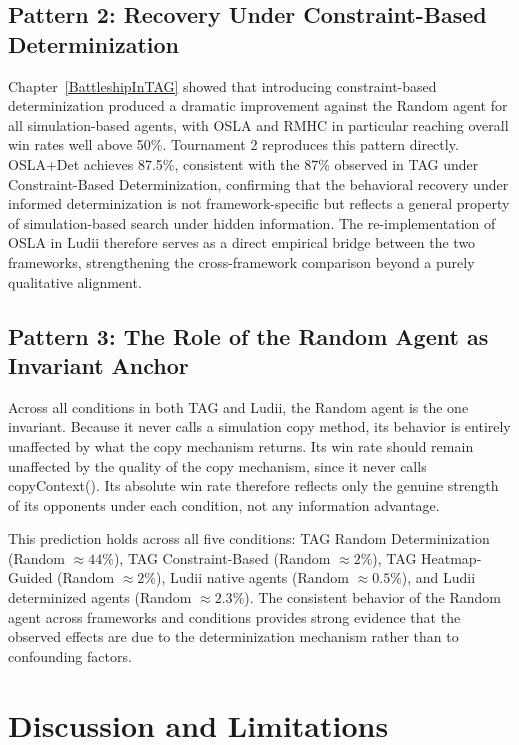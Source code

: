 \subsection{Pattern 2: Recovery Under Constraint-Based Determinization}
Chapter~\ref{BattleshipInTAG} showed that introducing constraint-based determinization produced a dramatic improvement against the Random agent for all simulation-based agents, with OSLA and RMHC in particular reaching overall win rates well above 50\%. Tournament 2 reproduces this pattern directly. OSLA+Det achieves 87.5\%, consistent with the 87\% observed in TAG under Constraint-Based Determinization, confirming that the behavioral recovery under informed determinization is not framework-specific but reflects a general property of simulation-based search under hidden information. The re-implementation of OSLA in Ludii therefore serves as a direct 
empirical bridge between the two frameworks, strengthening the cross-framework comparison beyond a purely qualitative alignment.

\subsection{Pattern 3: The Role of the Random Agent as Invariant Anchor}
Across all conditions in both TAG and Ludii, the Random agent is the one invariant. Because it never calls a simulation copy method, its behavior is entirely unaffected by what the copy mechanism returns. Its win rate should remain unaffected by the quality of the copy mechanism, since it never calls copyContext(). Its absolute win rate therefore reflects only the genuine strength of its opponents under each condition, not any information advantage.

This prediction holds across all five conditions: TAG Random Determinization (Random $\approx 44\%$), TAG Constraint-Based (Random $\approx 2\%$), TAG Heatmap-Guided (Random $\approx 2\%$), Ludii native agents (Random $\approx 0.5\%$), and Ludii determinized agents (Random $\approx 2.3\%$). The consistent behavior of the Random agent across frameworks and conditions provides strong evidence that the observed effects are due to the determinization mechanism rather than to confounding factors.


\section{Discussion and Limitations}
\label{sec:results_discussion}


